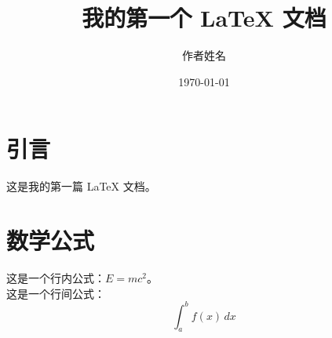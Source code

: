 \documentclass{article} %
\title{我的第一个 LaTeX 文档} %
\author{作者姓名} %
\date{\today} %
\begin{document}
	\maketitle %
	\section{引言} %
	这是我的第一篇 LaTeX 文档。
	\section{数学公式}
	这是一个行内公式：$E=mc^2$。 \\
	这是一个行间公式：
	\[
	\int_a^b f(x) \, dx
	\]
\end{document}
